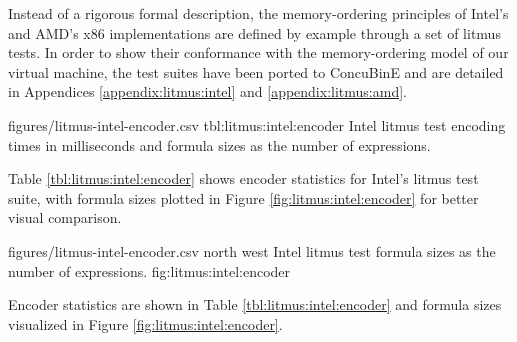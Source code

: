 Instead of a rigorous formal description, the memory-ordering principles of Intel's \cite{ref:Intel} and AMD's \cite{ref:AMD} x86 implementations are defined by example through a set of litmus tests.
In order to show their conformance with the memory-ordering model of our virtual machine, the test suites have been ported to ConcuBinE and are detailed in Appendices \ref{appendix:litmus:intel} and \ref{appendix:litmus:amd}.



\newcommand{\StatsTableRowHeader}[1]{\hyperref[tbl:litmus:intel:#1]{#1}}


\EncoderStatsTable
  {figures/litmus-intel-encoder.csv}
  {tbl:litmus:intel:encoder}
  {Intel litmus test encoding times in milliseconds and formula sizes as the number of expressions.}

Table \ref{tbl:litmus:intel:encoder} shows encoder statistics for Intel's litmus test suite, with formula sizes plotted in Figure \ref{fig:litmus:intel:encoder} for better visual comparison.

\EncoderStatsGraph
  {figures/litmus-intel-encoder.csv}
  {north west}
  {Intel litmus test formula sizes as the number of expressions.}
  {fig:litmus:intel:encoder}

Encoder statistics are shown in Table \ref{tbl:litmus:intel:encoder} and formula sizes visualized in Figure \ref{fig:litmus:intel:encoder}.

